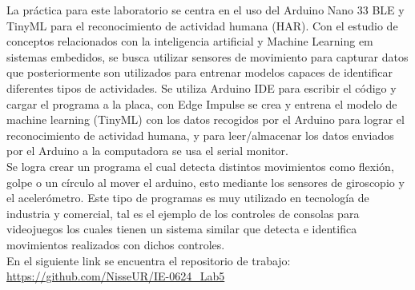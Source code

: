
La práctica para este laboratorio se centra en el uso del Arduino Nano 33 BLE y TinyML para el reconocimiento de actividad humana (HAR). Con el estudio de conceptos relacionados con la inteligencia artificial y Machine Learning em sistemas embedidos, se busca utilizar sensores de movimiento para capturar datos que posteriormente son utilizados para entrenar modelos capaces de identificar diferentes tipos de actividades. Se utiliza Arduino IDE para escribir el código y cargar el programa a la placa, con Edge Impulse se crea y entrena el modelo de machine learning (TinyML) con los datos recogidos por el Arduino para lograr el reconocimiento de actividad humana, y para leer/almacenar los datos enviados por el Arduino a la computadora se usa el serial monitor. \\

Se logra crear un programa el cual detecta distintos movimientos como flexión, golpe o un círculo al mover el arduino, esto mediante los sensores de giroscopio y el acelerómetro. Este tipo de programas es muy utilizado en tecnología de industria y comercial, tal es el ejemplo de los controles de consolas para videojuegos los cuales tienen un sistema similar que detecta e identifica movimientos realizados con dichos controles. \\ 

En el siguiente link se encuentra el repositorio de trabajo: \url{https://github.com/NisseUR/IE-0624_Lab5}

